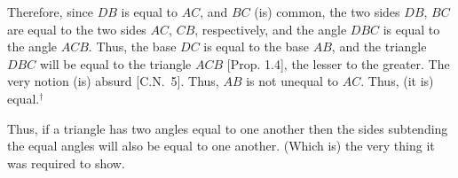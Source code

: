 \begin{Parallel}{}{}
{Therefore, since $DB$ is equal to $AC$, and $BC$ (is) common, the two sides $DB$, $BC$ are equal to the two sides $AC$, $CB$, respectively, and the angle $DBC$
is equal to the angle $ACB$. Thus, the base $DC$ is equal to the base
$AB$, and the triangle $DBC$ will be equal to the triangle $ACB$ [Prop. 1.4], the lesser
to the greater. The very notion (is) absurd [C.N.~5]. Thus, $AB$ is not unequal
to $AC$. Thus, (it is) equal.$^\dag$

Thus, if a triangle has two angles equal to one another then the sides subtending the
equal angles will also be equal to one another. (Which is) the very thing it was required to show.}
\end{Parallel}


\vspace{7pt}{\footnotesize \noindent $^\dag$ Here, use is made of the previously
unmentioned common notion that if two quantities are not unequal then they must be equal. Later on, use is made of the closely related common notion
that if two quantities are not greater than or less than one another, respectively, then they must be equal to one another.}

